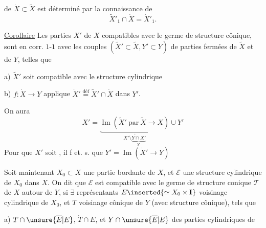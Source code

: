 de $\dot X\subset\widetilde X$ est déterminé par la connaissance de
\[
\widetilde X'_1\cap\dot X=\dot X'_1.
\]

\uline{Corollaire} Les parties  $X'$ de $X$ compatibles avec
le germe de structure cônique, sont en
corr. $1$-$1$ avec les couples $(\widetilde X'\subset\widetilde X,Y'\subset Y)$
de parties fermées de $\widetilde X$ et de $Y$, telles que

a) $\widetilde X'$ soit compatible avec le  structure cylindrique

b) $f:\dot X\to Y$ applique 
$\dot X'\overset{\text{déf}}{=}\widetilde X'\cap\dot X$ dans $Y'$.

On aura
\[
X'=\underbrace{\operatorname{Im}(\widetilde X'\ \text{par}\ \widetilde X\to X)}
_{\overline{X'\setminus\underbrace{Y\cap X'}_{Y'}}}\cup Y'
\]
Pour que $X'$ soit 
,
il f et. s. que $Y'=\operatorname{Im}(\dot X'\to Y)$

Soit maintenant $X_0\subset X$ une partie
bordante de $X$, et $\mathcal E$ une  structure cylindrique
de $X_0$ dans $X$. On dit que $\mathcal E$ est compatible
avec le germe de structure conique $\mathcal T$
de $X$ autour de $Y$, si $\exists$ représentants
$E\inserted{\simeq X_0\times\mathbf I}$ voisinage cylindrique de $X_0$, et $T$ voisinage
cônique de $Y$ (avec  structure cônique), tels que


a) $T\cap\unsure{\overline E|E}$, $\dot T\cap E$, et $Y\cap\unsure{\overline E|E}$
  des parties cylindriques de

